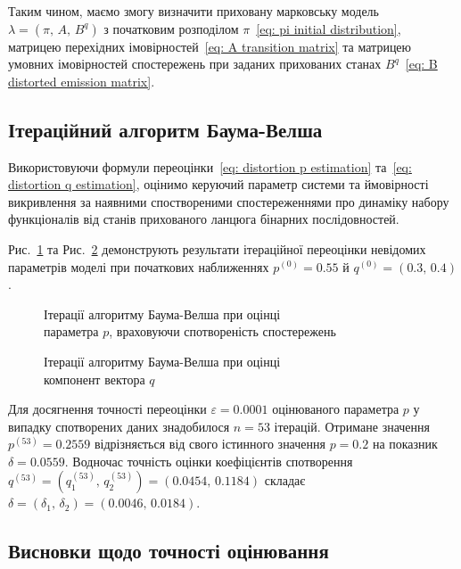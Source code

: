 Таким чином, маємо змогу визначити приховану марковську модель $\lambda=\left( \pi,\,A,\,B^q \right)$ з початковим розподілом $\pi$~\eqref{eq: pi initial distribution}, матрицею перехідних імовірностей~\eqref{eq: A transition matrix} та матрицею умовних імовірностей спостережень при заданих прихованих станах $B^q$~\eqref{eq: B distorted emission matrix}.

\subsection{Ітераційний алгоритм Баума-Велша}

Використовуючи формули переоцінки~\eqref{eq: distortion p estimation} та~\eqref{eq: distortion q estimation}, оцінимо керуючий параметр системи та ймовірності викривлення за наявними споствореними спостереженнями про динаміку набору функціоналів від станів прихованого ланцюга бінарних послідовностей. 

Рис.~\ref{pic: p distortion estimation} та Рис.~\ref{pic: q distortion estimation} демонструють результати ітераційної переоцінки невідомих параметрів моделі при початкових наближеннях $p^{(0)}=0.55$ й $q^{(0)}=(0.3,\,0.4)$. 

\begin{figure}[H]\centering
    \setfontsize{14pt}
    
    \caption{Ітерації алгоритму Баума-Велша при оцінці \\ параметра $p$, враховуючи спотвореність спостережень}
    \label{pic: p distortion estimation}
\end{figure}

\begin{figure}[H]\centering
    \setfontsize{14pt}
    
    \caption{Ітерації алгоритму Баума-Велша при оцінці \\ компонент вектора $q$}
    \label{pic: q distortion estimation}
\end{figure}

Для досягнення точності переоцінки $\varepsilon=0.0001$ оцінюваного параметра $p$ у випадку спотворених даних знадобилося $n=53$ ітерацій. Отримане значення $p^{(53)}=0.2559$ відрізняється від свого істинного значення $p=0.2$ на показник $\delta=0.0559$. Водночас точність оцінки коефіцієнтів спотворення $q^{(53)} = \left( q^{(53)}_1,\,q^{(53)}_2 \right) = (0.0454,\,0.1184)$ складає $\delta=(\delta_1,\,\delta_2)=(0.0046,\,0.0184)$.

\subsection{Висновки щодо точності оцінювання}


